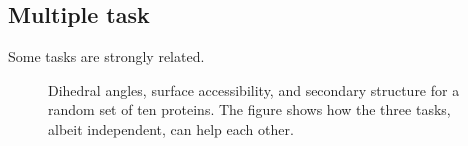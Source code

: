 \subsection{Multiple task}
Some tasks are strongly related.

\begin{figure}
\centering
\caption{Dihedral angles, surface accessibility, and secondary structure for a random set of ten proteins.
The figure shows how the three tasks, albeit independent, can help each other. }\label{fig:transfer_learning}
\end{figure}